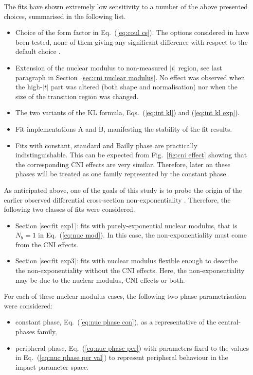 The fits have shown extremely low sensitivity to a number of the above presented choices, summarised in the following list. 
\begin{itemize}
\item Choice of the form factor in Eq.~(\ref{eq:coul cs}). The options considered in \cite{elegent} have been tested, none of them giving any significant difference with respect to the default choice \cite{puckett10}.
\item Extension of the nuclear modulus to non-measured $|t|$ region, see last paragraph in Section~\ref{sec:cni nuclear modulus}. No effect was observed when the high-$|t|$ part was altered (both shape and normalisation) nor when the size of the transition region was changed.
\item The two variants of the KL formula, Eqs.~(\ref{eq:int kl}) and (\ref{eq:int kl exp}).
\item Fit implementations A and B, manifesting the stability of the fit results.
\item Fits with constant, standard and Bailly phase are practically indistinguishable. This can be expected from Fig.~\ref{fig:cni effect} showing that the corresponding CNI effects are very similar. Therefore, later on these phases will be treated as one family represented by the constant phase.
\end{itemize}


As anticipated above, one of the goals of this study is to probe the origin of the earlier observed differential cross-section non-exponentiality \cite{8tev-90m}. Therefore, the following two classes of fits were considered.
\begin{itemize}
\item Section \ref{sec:fit exp1}: fits with purely-exponential nuclear modulus, that is $N_b=1$ in Eq.~(\ref{eq:nuc mod}). In this case, the non-exponentiality must come from the CNI effects.
\item Section \ref{sec:fit exp3}: fits with nuclear modulus flexible enough to describe the non-exponentiality without the CNI effects. Here, the non-exponentiality may be due to the nuclear modulus, CNI effects or both.
\end{itemize}
For each of these nuclear modulus cases, the following two phase parametrisation were considered:
\begin{itemize}\setlength\itemsep{0pt}
\item constant phase, Eq.~(\ref{eq:nuc phase con}), as a representative of the central-phases family,
\item peripheral phase, Eq.~(\ref{eq:nuc phase per}) with parameters fixed to the values in Eq.~(\ref{eq:nuc phase per val}) to represent peripheral behaviour in the impact parameter space.
\end{itemize}

